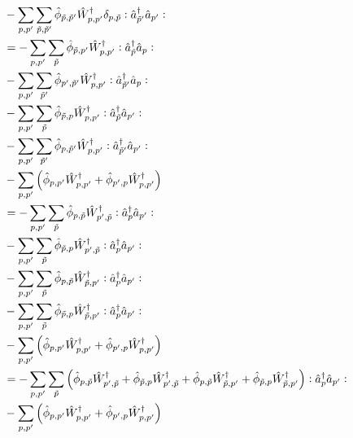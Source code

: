 \begin{appendix}
\begin{itemize}
\begin{align}
&-\Sum_{p, p^\prime}\Sum_{\tilde p,\tilde p^\prime} \hat\phi_{\tilde p,\tilde p^\prime}\hat W_{p,p^\prime}^\dagger \delta_{p,\tilde p}\NO\CR_{\tilde p^\prime}\AN_{p^\prime}\NO \nonumber\\
&=-\Sum_{p, p^\prime}\Sum_{\tilde p} \hat\phi_{\tilde p,p^\prime}\hat W_{p,p^\prime}^\dagger \NO\CR_{\tilde p}\AN_p\NO \\
&-\Sum_{p, p^\prime}\Sum_{\tilde p^\prime} \hat\phi_{p^\prime,\tilde p^\prime}\hat W_{p,p^\prime}^\dagger\NO\CR_{\tilde p^\prime}\AN_p\NO \nonumber\\
&-\Sum_{p, p^\prime}\Sum_{\tilde p} \hat\phi_{\tilde p,p}\hat W_{p,p^\prime}^\dagger \NO\CR_{\tilde p}\AN_{p^\prime}\NO \nonumber\\
&-\Sum_{p, p^\prime}\Sum_{\tilde p^\prime} \hat\phi_{p,\tilde p^\prime}\hat W_{p,p^\prime}^\dagger\NO\CR_{\tilde p^\prime}\AN_{p^\prime}\NO \nonumber\\
&-\Sum_{p, p^\prime}\left( \hat\phi_{ p, p^\prime}\hat W_{p,p^\prime}^\dagger+ \hat\phi_{p^\prime,p}\hat W_{p,p^\prime}^\dagger\right)\nonumber\\
&=-\Sum_{p, p^\prime}\Sum_{\tilde p} \hat\phi_{p,\tilde p}\hat W_{p^\prime,\tilde p}^\dagger \NO\CR_{p}\AN_{p^\prime}\NO \\
&-\Sum_{p, p^\prime}\Sum_{\tilde p} \hat\phi_{\tilde p,p}\hat W_{p^\prime,\tilde p}^\dagger\NO\CR_{p}\AN_{p^\prime}\NO \nonumber\\
&-\Sum_{p, p^\prime}\Sum_{\tilde p} \hat\phi_{p,\tilde p}\hat W_{\tilde p,p^\prime}^\dagger \NO\CR_{p}\AN_{p^\prime}\NO \nonumber\\
&-\Sum_{p, p^\prime}\Sum_{\tilde p} \hat\phi_{\tilde p,p}\hat W_{\tilde p,p^\prime}^\dagger\NO\CR_{p}\AN_{p^\prime}\NO \nonumber\\
&-\Sum_{p, p^\prime}\left( \hat\phi_{ p, p^\prime}\hat W_{p,p^\prime}^\dagger+ \hat\phi_{p^\prime,p}\hat W_{p,p^\prime}^\dagger\right)\nonumber\\
&=-\Sum_{p, p^\prime}\Sum_{\tilde p} \left(\hat\phi_{p,\tilde p}\hat W_{p^\prime,\tilde p}^\dagger+\hat\phi_{\tilde p,p}\hat W_{p^\prime,\tilde p}^\dagger+\hat\phi_{p,\tilde p}\hat W_{\tilde p,p^\prime}^\dagger  + \hat\phi_{\tilde p,p}\hat W_{\tilde p,p^\prime}^\dagger\right)\NO\CR_{p}\AN_{p^\prime}\NO \\
&-\Sum_{p, p^\prime}\left( \hat\phi_{ p, p^\prime}\hat W_{p,p^\prime}^\dagger+ \hat\phi_{p^\prime,p}\hat W_{p,p^\prime}^\dagger\right)\nonumber

\end{align}
\end{itemize}
\end{appendix}
